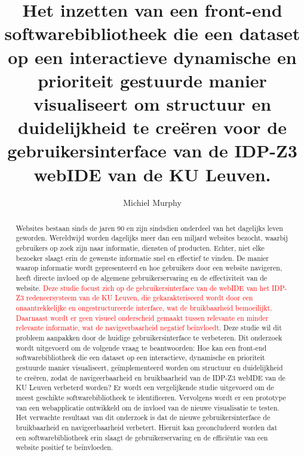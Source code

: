 \documentclass{hogent-article}
\title{Het inzetten van een front-end softwarebibliotheek die een dataset op een interactieve dynamische en prioriteit gestuurde manier visualiseert om structuur en duidelijkheid te creëren voor de gebruikersinterface van de IDP-Z3 webIDE van de KU Leuven.}
\author{Michiel Murphy}
\begin{document}
\begin{abstract}
 Websites bestaan sinds de jaren 90 en zijn sindsdien onderdeel van het dagelijks leven geworden. Wereldwijd worden dagelijks meer dan een miljard websites bezocht, waarbij gebruikers op zoek zijn naar informatie, diensten of producten. Echter, niet elke bezoeker slaagt erin de gewenste informatie snel en effectief te vinden. De manier waarop informatie wordt gepresenteerd en hoe gebruikers door een website navigeren, heeft directe invloed op de algemene gebruikerservaring en de effectiviteit van de website. \textcolor{red}{Deze studie focust zich op de gebruikersinterface van de webIDE van het IDP-Z3 redeneersysteem van de KU Leuven, die gekarakteriseerd wordt door een onaantrekkelijke en ongestructureerde interface, wat de bruikbaarheid bemoeilijkt. Daarnaast wordt er geen visueel onderscheid gemaakt tussen relevante en minder relevante informatie, wat de navigeerbaarheid negatief beïnvloedt.} Deze studie wil dit probleem aanpakken door de huidige gebruikersinterface te verbeteren. Dit onderzoek wordt uitgevoerd om de volgende vraag te beantwoorden: Hoe kan een front-end softwarebibliotheek die een dataset op een interactieve, dynamische en prioriteit gestuurde manier visualiseert, geïmplementeerd worden om structuur en duidelijkheid te creëren, zodat de navigeerbaarheid en bruikbaarheid van de IDP-Z3 webIDE van de KU Leuven verbeterd worden? Er wordt een vergelijkende studie uitgevoerd om de meest geschikte softwarebibliotheek te identificeren. Vervolgens wordt er een prototype van een webapplicatie ontwikkeld om de invloed van de nieuwe visualisatie te testen. Het verwachte resultaat van dit onderzoek is dat de nieuwe gebruikersinterface de bruikbaarheid en navigeerbaarheid verbetert. Hieruit kan geconcludeerd worden dat een softwarebibliotheek erin slaagt de gebruikerservaring en de efficiëntie van een website positief te beïnvloeden.
\end{abstract}

\tableofcontents



\printbibliography[heading=bibintoc]
\end{document}
